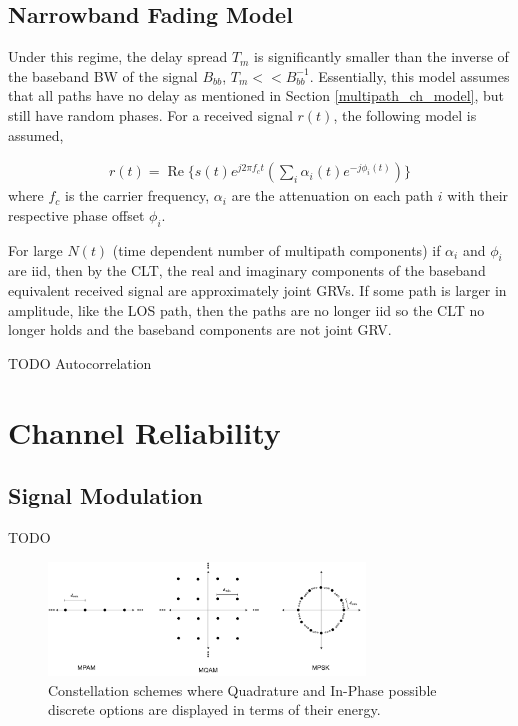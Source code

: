 \documentclass[12pt]{report} %
\begin{document}
\section{Narrowband Fading Model}
Under this regime, the delay spread $T_m$ is significantly smaller than the inverse of the baseband \gls{BW} of the signal $B_{bb}$, $T_m << B^{-1}_{bb}$. Essentially, this model assumes that all paths have no delay as mentioned in Section \ref{multipath_ch_model}, but still have random phases. For a received signal $r(t)$, the following model is assumed,

\begin{align}
  r(t) = \operatorname{Re} \Biggl\{ s(t) e^{j2\pi f_c t} \left(\sum_i \alpha_i(t) e^{-j \phi_i(t)}\right) \Biggr\}
\end{align}
where $f_c$ is the carrier frequency, $\alpha_i$ are the attenuation on each path $i$ with their respective phase offset $\phi_i$.

For large $N(t)$ (time dependent number of multipath components) if $\alpha_i$ and $\phi_i$ are \gls{iid}, then by the \gls{CLT}, the real and imaginary components of the baseband equivalent received signal are approximately joint \glspl{GRV}. If some path is larger in amplitude, like the \gls{LOS} path, then the paths are no longer \gls{iid} so the \gls{CLT} no longer holds and the baseband components are not joint \gls{GRV}.

TODO Autocorrelation
\chapter{Channel Reliability}


\section{Signal Modulation}

TODO

\begin{figure}[t]
  \centering
  \includegraphics[width=0.75\textwidth]{figs/constellations.pdf}
  \caption{Constellation schemes where Quadrature and In-Phase possible discrete options are displayed in terms of their energy.}
  \label{fig:constellations}
\end{figure}
\end{document}
